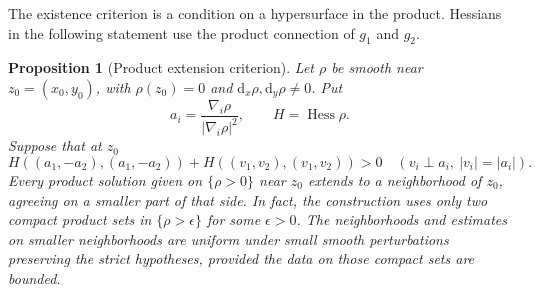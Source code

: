 \documentclass[11pt]{article}
\newtheorem{proposition}[theorem]{Proposition}
\theoremstyle{definition}
\theoremstyle{remark}
\newcommand{\dd}{\mathrm d}
\numberwithin{equation}{section}
\begin{document}
The existence criterion is a condition on a hypersurface in the
product.  Hessians in the following statement use the product
connection of $g_1$ and $g_2$.

\begin{proposition}[Product extension criterion]\label{cross:criterion}
Let $\rho$ be smooth near $z_0=(x_0,y_0)$, with $\rho(z_0)=0$ and
$\dd_x\rho,\dd_y\rho\ne0$.  Put
\[
 a_i=\frac{\nabla_i\rho}{|\nabla_i\rho|^2},\qquad H=\operatorname{Hess}\rho.
\]
Suppose that at $z_0$
\begin{equation}\label{cross:hessian-test}
 H((a_1,-a_2),(a_1,-a_2))
 +H((v_1,v_2),(v_1,v_2))>0
 \quad
 \left(v_i\perp a_i,\ |v_i|=|a_i|\right).
\end{equation}
Every product solution given on $\{\rho>0\}$ near $z_0$ extends to
a neighborhood of $z_0$, agreeing on a smaller part of that side.
In fact, the construction uses only two compact product sets in
$\{\rho>\epsilon\}$ for some $\epsilon>0$.
The neighborhoods and estimates on smaller neighborhoods are uniform
under small smooth perturbations preserving the strict hypotheses,
provided the data on those compact sets are bounded.
\end{proposition}
\end{document}
